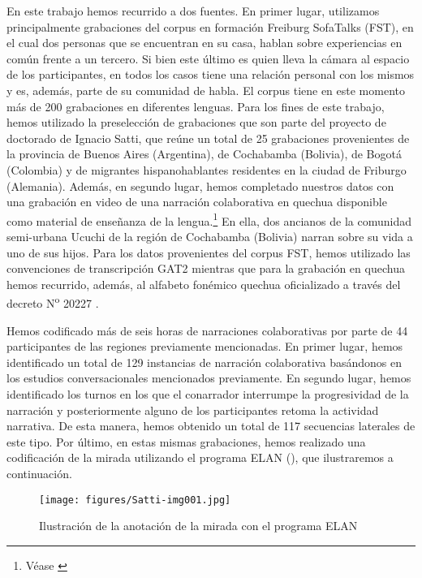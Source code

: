 \documentclass[output=paper]{../langscibook}
\begin{document}
En este trabajo hemos recurrido a dos fuentes. En primer lugar, utilizamos principalmente grabaciones del corpus en formación Freiburg SofaTalks (FST), en el cual dos personas que se encuentran en su casa, hablan sobre experiencias en común frente a un tercero. Si bien este último es quien lleva la cámara al espacio de los participantes, en todos los casos tiene una relación personal con los mismos y es, además, parte de su comunidad de habla. El corpus tiene en este momento más de 200 grabaciones en diferentes lenguas. Para los fines de este trabajo, hemos utilizado la preselección de grabaciones que son parte del proyecto de doctorado de Ignacio Satti, que reúne un total de 25 grabaciones provenientes de la provincia de Buenos Aires (Argentina), de Cochabamba (Bolivia), de Bogotá (Colombia) y de migrantes hispanohablantes residentes en la ciudad de Friburgo (Alemania). Además, en segundo lugar, hemos completado nuestros datos con una grabación en video de una narración colaborativa en quechua disponible como material de enseñanza de la lengua.\footnote {Véase \citet{AndersenDaza1994}} En ella, dos ancianos de la comunidad semi-urbana Ucuchi de la región de Cochabamba (Bolivia) narran sobre su vida a uno de sus hijos.  Para los datos provenientes del corpus FST, hemos utilizado las convenciones de transcripción GAT2 \citep{EhmerEtAl2019} mientras que para la grabación en quechua hemos recurrido, además, al alfabeto fonémico quechua oficializado a través del decreto N\textsuperscript{o} 20227 \citep[86]{Choque2005}.

Hemos codificado más de seis horas de narraciones colaborativas por parte de 44 participantes de las regiones previamente mencionadas. En primer lugar, hemos identificado un total de 129 instancias de narración colaborativa basándonos en los estudios conversacionales mencionados previamente. En segundo lugar, hemos identificado los turnos en los que el conarrador interrumpe la progresividad de la narración y posteriormente alguno de los participantes retoma la actividad narrativa. De esta manera, hemos obtenido un total de 117 secuencias laterales de este tipo. Por último, en estas mismas grabaciones, hemos realizado una codificación de la mirada utilizando el programa ELAN (), que ilustraremos a continuación.

  
\begin{figure}
\texttt{[image: figures/Satti-img001.jpg]}
\caption{\label{fig:satti:1} Ilustración de la anotación de la mirada con el programa ELAN}
\end{figure}
\end{document}
